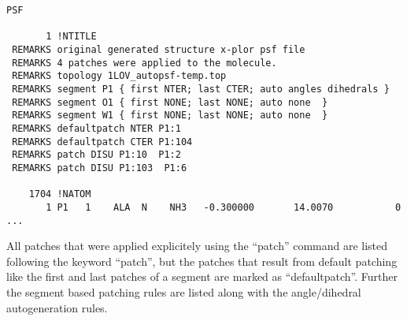 \begin{verbatim}
PSF

       1 !NTITLE
 REMARKS original generated structure x-plor psf file
 REMARKS 4 patches were applied to the molecule.
 REMARKS topology 1LOV_autopsf-temp.top
 REMARKS segment P1 { first NTER; last CTER; auto angles dihedrals }
 REMARKS segment O1 { first NONE; last NONE; auto none  }
 REMARKS segment W1 { first NONE; last NONE; auto none  }
 REMARKS defaultpatch NTER P1:1
 REMARKS defaultpatch CTER P1:104
 REMARKS patch DISU P1:10  P1:2
 REMARKS patch DISU P1:103  P1:6

    1704 !NATOM
       1 P1   1    ALA  N    NH3   -0.300000       14.0070           0
...
\end{verbatim}

All patches that were applied explicitely using the ``patch'' command are 
listed following the keyword  ``patch'', but the patches that
result from default patching like the first and last patches of a segment 
are marked as ``defaultpatch''. Further the segment based patching rules are
listed along with the angle/dihedral autogeneration rules.
